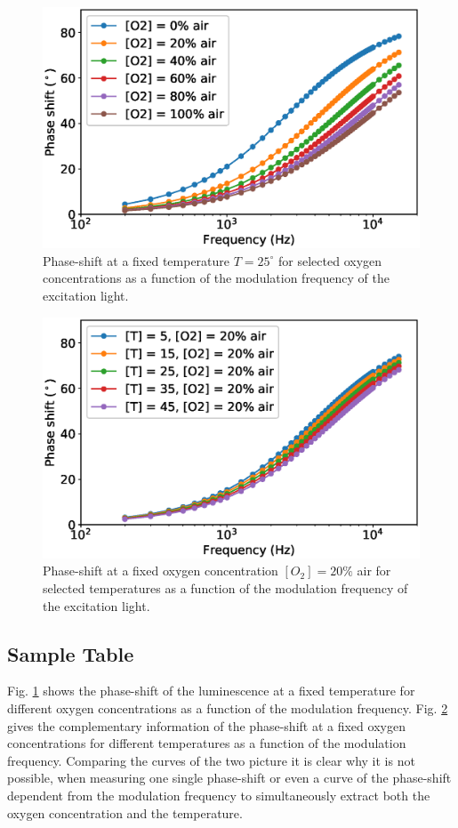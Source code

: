 \documentclass[9pt,twocolumn,twoside,pdftex]{optica}
\begin{document}
\begin{figure}[htbp]
\centering
\includegraphics[width=9 cm]{expdata1.eps}
\caption{Phase-shift at a fixed temperature $T=25 ^{\circ}$ for selected oxygen concentrations as a function of the modulation frequency of the excitation light.}
\label{fig:expdata1}
\end{figure}

\begin{figure}[htbp]
\centering
\includegraphics[width=9 cm]{expdata2.eps}
\caption{Phase-shift at a fixed oxygen concentration $[O_2]=20 \%$ air for selected temperatures as a function of the modulation frequency of the excitation light.}
\label{fig:expdata2}
\end{figure}
\subsection{Sample Table}

Fig. \ref{fig:expdata1} shows the phase-shift of the luminescence at a fixed temperature for different oxygen concentrations as a function of the modulation frequency. Fig. \ref{fig:expdata2} gives the complementary information of the phase-shift at a fixed oxygen concentrations for different temperatures as a function of the modulation frequency. Comparing the curves of the two picture it is clear why it is not possible, when measuring one single phase-shift or even a curve of the phase-shift dependent from the modulation frequency to simultaneously extract both the oxygen concentration and the temperature. 
\end{document}
